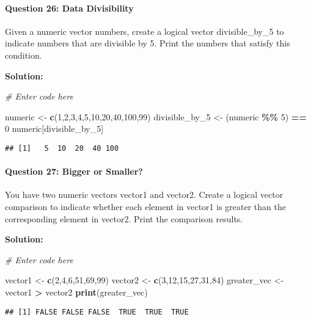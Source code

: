 \documentclass[
]{article}
\newenvironment{Shaded}{\begin{snugshade}}{\end{snugshade}}
\newcommand{\CommentTok}[1]{\textcolor[rgb]{0.56,0.35,0.01}{\textit{#1}}}
\newcommand{\DecValTok}[1]{\textcolor[rgb]{0.00,0.00,0.81}{#1}}
\newcommand{\FunctionTok}[1]{\textcolor[rgb]{0.13,0.29,0.53}{\textbf{#1}}}
\newcommand{\NormalTok}[1]{#1}
\newcommand{\OtherTok}[1]{\textcolor[rgb]{0.56,0.35,0.01}{#1}}
\newcommand{\SpecialCharTok}[1]{\textcolor[rgb]{0.81,0.36,0.00}{\textbf{#1}}}
\begin{document}
\hypertarget{question-26-data-divisibility}{%
\paragraph{Question 26: Data
Divisibility}\label{question-26-data-divisibility}}

Given a numeric vector numbers, create a logical vector divisible\_by\_5
to indicate numbers that are divisible by 5. Print the numbers that
satisfy this condition.

\textbf{Solution:}

\begin{Shaded}
\begin{Highlighting}[]
\CommentTok{\# Enter code here}

\NormalTok{numeric }\OtherTok{\textless{}{-}} \FunctionTok{c}\NormalTok{(}\DecValTok{1}\NormalTok{,}\DecValTok{2}\NormalTok{,}\DecValTok{3}\NormalTok{,}\DecValTok{4}\NormalTok{,}\DecValTok{5}\NormalTok{,}\DecValTok{10}\NormalTok{,}\DecValTok{20}\NormalTok{,}\DecValTok{40}\NormalTok{,}\DecValTok{100}\NormalTok{,}\DecValTok{99}\NormalTok{)}
\NormalTok{divisible\_by\_5 }\OtherTok{\textless{}{-}}\NormalTok{ (numeric }\SpecialCharTok{\%\%} \DecValTok{5}\NormalTok{) }\SpecialCharTok{==} \DecValTok{0} 
\NormalTok{numeric[divisible\_by\_5]}
\end{Highlighting}
\end{Shaded}

\begin{verbatim}
## [1]   5  10  20  40 100
\end{verbatim}

\hypertarget{question-27-bigger-or-smaller}{%
\paragraph{Question 27: Bigger or
Smaller?}\label{question-27-bigger-or-smaller}}

You have two numeric vectors vector1 and vector2. Create a logical
vector comparison to indicate whether each element in vector1 is greater
than the corresponding element in vector2. Print the comparison results.

\textbf{Solution:}

\begin{Shaded}
\begin{Highlighting}[]
\CommentTok{\# Enter code here}

\NormalTok{vector1 }\OtherTok{\textless{}{-}} \FunctionTok{c}\NormalTok{(}\DecValTok{2}\NormalTok{,}\DecValTok{4}\NormalTok{,}\DecValTok{6}\NormalTok{,}\DecValTok{51}\NormalTok{,}\DecValTok{69}\NormalTok{,}\DecValTok{99}\NormalTok{)}
\NormalTok{vector2 }\OtherTok{\textless{}{-}} \FunctionTok{c}\NormalTok{(}\DecValTok{3}\NormalTok{,}\DecValTok{12}\NormalTok{,}\DecValTok{15}\NormalTok{,}\DecValTok{27}\NormalTok{,}\DecValTok{31}\NormalTok{,}\DecValTok{84}\NormalTok{)}
\NormalTok{greater\_vec }\OtherTok{\textless{}{-}}\NormalTok{ vector1 }\SpecialCharTok{\textgreater{}}\NormalTok{ vector2 }
\FunctionTok{print}\NormalTok{(greater\_vec)}
\end{Highlighting}
\end{Shaded}

\begin{verbatim}
## [1] FALSE FALSE FALSE  TRUE  TRUE  TRUE
\end{verbatim}
\end{document}
